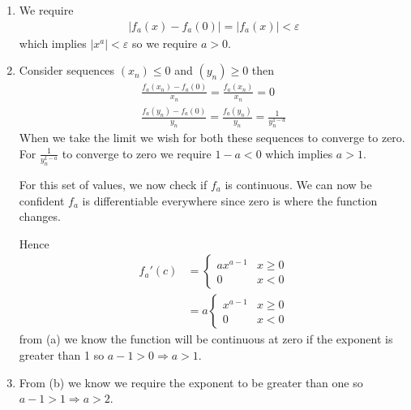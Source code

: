 \begin{enumerate}[label=(\alph*)]
    \item 
    We require 
    \begin{align*}
        |f_a(x)-f_a(0)| = |f_a(x)| < \varepsilon
    \end{align*}
    which implies $|x^a| < \varepsilon$ so we require $a>0$.

    \item
    Consider sequences $(x_n)\leq 0$ and $(y_n)\geq 0$ then 
    \begin{gather*}
        \frac{f_a(x_n)-f_a(0)}{x_n} = \frac{f_a(x_n)}{x_n} = 0 \\
        \frac{f_a(y_n)-f_a(0)}{y_n} = \frac{f_a(y_n)}{y_n} = \frac{1}{y_n^{1-a}}
    \end{gather*}
    When we take the limit we wish for both these sequences to converge to zero.
    For $\frac{1}{y_n^{1-a}}$ to converge to zero we require $1-a<0$
    which implies $a>1$.

    For this set of values, we now check if $f_a$ is continuous.
    We can now be confident $f_a$ is differentiable everywhere since zero 
    is where the function changes.

    Hence
    \begin{align*}
        f_a'(c) &= \begin{cases}
            ax^{a-1} & x\geq 0 \\
            0 & x < 0
        \end{cases} \\ 
        &= a\begin{cases}
            x^{a-1} & x\geq 0 \\
            0 & x < 0
        \end{cases}
    \end{align*}
    from (a) we know the function will be continuous at zero 
    if the exponent is greater than 1 so $a-1>0 \Rightarrow a>1$.

    \item
    From (b) we know we require the exponent to be greater than one so 
    $a-1>1 \Rightarrow a>2$.
\end{enumerate}

